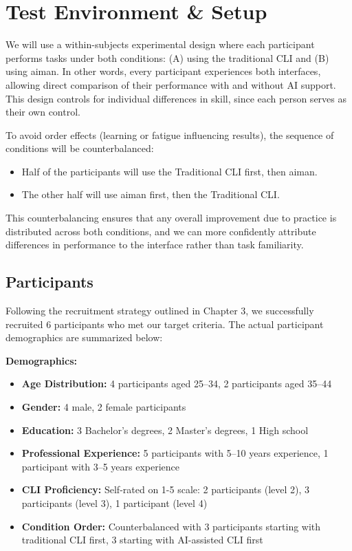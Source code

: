 \section{Test Environment \& Setup}

We will use a within-subjects experimental design where each participant performs tasks under both conditions: (A) using the traditional CLI and (B) using aiman. In other words, every participant experiences both interfaces, allowing direct comparison of their performance with and without AI support. This design controls for individual differences in skill, since each person serves as their own control.

To avoid order effects (learning or fatigue influencing results), the sequence of conditions will be counterbalanced:
\begin{itemize}
	\item Half of the participants will use the Traditional CLI first, then aiman.
	\item The other half will use aiman first, then the Traditional CLI.
\end{itemize}

This counterbalancing ensures that any overall improvement due to practice is distributed across both conditions, and we can more confidently attribute differences in performance to the interface rather than task familiarity.

\subsection{Participants}

Following the recruitment strategy outlined in Chapter 3, we successfully recruited 6 participants who met our target criteria. The actual participant demographics are summarized below:

\textbf{Demographics:}
\begin{itemize}
	\item \textbf{Age Distribution:} 4 participants aged 25–34, 2 participants aged 35–44
	\item \textbf{Gender:} 4 male, 2 female participants
	\item \textbf{Education:} 3 Bachelor's degrees, 2 Master's degrees, 1 High school
	\item \textbf{Professional Experience:} 5 participants with 5–10 years experience, 1 participant with 3–5 years experience
	\item \textbf{CLI Proficiency:} Self-rated on 1-5 scale: 2 participants (level 2), 3 participants (level 3), 1 participant (level 4)
	\item \textbf{Condition Order:} Counterbalanced with 3 participants starting with traditional CLI first, 3 starting with AI-assisted CLI first
\end{itemize}

